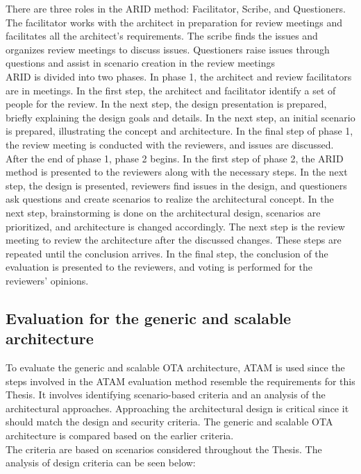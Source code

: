 \documentclass[12pt,a4paper]{article}
\begin{document}
{There are three roles in the ARID method: Facilitator, Scribe, and Questioners. The facilitator works with the architect in preparation for review meetings and facilitates all the architect's requirements. The scribe finds the issues and organizes review meetings to discuss issues. Questioners raise issues through questions and assist in scenario creation in the review meetings \cite{r42} \\

ARID is divided into two phases. In phase 1, the architect and review facilitators are in meetings. In the first step, the architect and facilitator identify a set of people for the review. In the next step, the design presentation is prepared, briefly explaining the design goals and details. In the next step, an initial scenario is prepared, illustrating the concept and architecture. In the final step of phase 1, the review meeting is conducted with the reviewers, and issues are discussed. After the end of phase 1, phase 2 begins. In the first step of phase 2, the ARID method is presented to the reviewers along with the necessary steps. In the next step, the design is presented, reviewers find issues in the design, and questioners ask questions and create scenarios to realize the architectural concept. In the next step, brainstorming is done on the architectural design, scenarios are prioritized, and architecture is changed accordingly. The next step is the review meeting to review the architecture after the discussed changes. These steps are repeated until the conclusion arrives. In the final step, the conclusion of the evaluation is presented to the reviewers, and voting is performed for the reviewers' opinions. \cite{r42}

\subsection{Evaluation for the generic and scalable architecture}

To evaluate the generic and scalable OTA architecture, ATAM is used since the steps involved in the ATAM evaluation method resemble the requirements for this Thesis. It involves identifying scenario-based criteria and an analysis of the architectural approaches. Approaching the architectural design is critical since it should match the design and security criteria. The generic and scalable OTA architecture is compared based on the earlier criteria. \cite{r43} \\

The criteria are based on scenarios considered throughout the Thesis. The analysis of design criteria can be seen below: 

}
\end{document}
